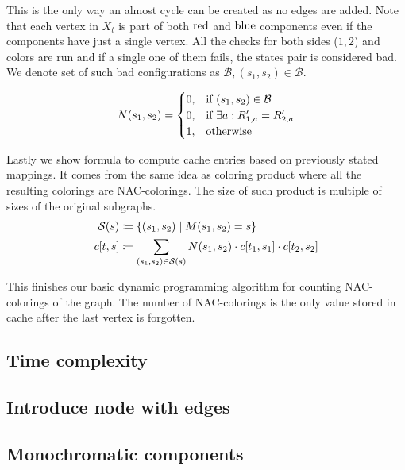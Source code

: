 This is the only way an almost cycle can be created as no edges are added.
Note that each vertex in \( X_t \) is part of both \( \text{red} \) and \( \text{blue} \)
components even if the components have just a single vertex.
All the checks for both sides (\( 1, 2 \)) and colors are run and
if a single one of them fails, the states pair is considered bad.
We denote set of such bad configurations as \( \mathcal{B}, (s_1, s_2) \in \mathcal{B} \).

%
\begin{align}
	N(s_1, s_2) =
	\begin{cases}
		0, & \text{if } (s_1, s_2) \in \mathcal{B}                  \\
		0, & \text{if } \exists a : R_{1,a}^\prime = R_{2,a}^\prime \\
		1, & \text{otherwise}
	\end{cases}\notag
\end{align}
%

Lastly we show formula to compute cache entries based on previously stated mappings.
It comes from the same idea as coloring product where all the resulting colorings
are NAC-colorings. The size of such product is multiple of sizes of the original subgraphs.
%
\begin{align}
	\mathcal{S}(s) & \coloneqq \{(s_1, s_2) \mid M(s_1, s_2) = s \}   \notag                                                     \\
	c[t, s]        & \coloneqq \sum_{(s_1, s_2) \in \mathcal{S}(s)} N(s_1, s_2) \cdot c[t_1, s_1] \cdot c[t_{2}, s_{2}]   \notag
\end{align}
%

This finishes our basic dynamic programming algorithm
for counting NAC-colorings of the graph.
The number of NAC-colorings is the only value stored in cache
after the last vertex is forgotten.



\subsection{Time complexity}
\subsection{Introduce node with edges}
\subsection{Monochromatic components}

